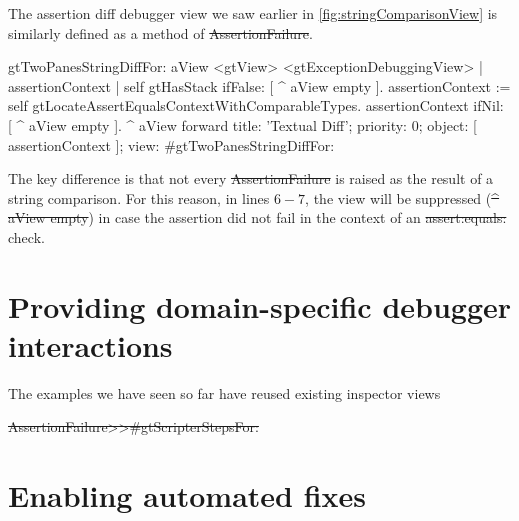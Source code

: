 \documentclass[sigplan,anonymous,review,10pt]{acmart}
\begin{document}
The assertion diff debugger view we saw earlier in \autoref{fig:stringComparisonView} is similarly defined as a method of \st{AssertionFailure}.
\begin{code}
gtTwoPanesStringDiffFor: aView
	<gtView>
	<gtExceptionDebuggingView>
	| assertionContext |
	self gtHasStack ifFalse: [ ^ aView empty ].
	assertionContext := self gtLocateAssertEqualsContextWithComparableTypes.
	assertionContext ifNil: [ ^ aView empty ].
	^ aView forward
		title: 'Textual Diff';
		priority: 0;
		object: [ assertionContext ];
		view: #gtTwoPanesStringDiffFor:
\end{code}
The key difference is that not every \st{AssertionFailure} is raised as the result of a string comparison.
For this reason, in lines $6-7$, the view will be suppressed (\st{^ aView empty}) in case the assertion did not fail in the context of an \st{assert:equals:} check.

\section{Providing domain-specific debugger interactions}\label{sec:interactions}

The examples we have seen so far have reused existing inspector views


\st{AssertionFailure>>#gtScripterStepsFor:}


\section{Enabling automated fixes}\label{sec:fixes}


\end{document}

